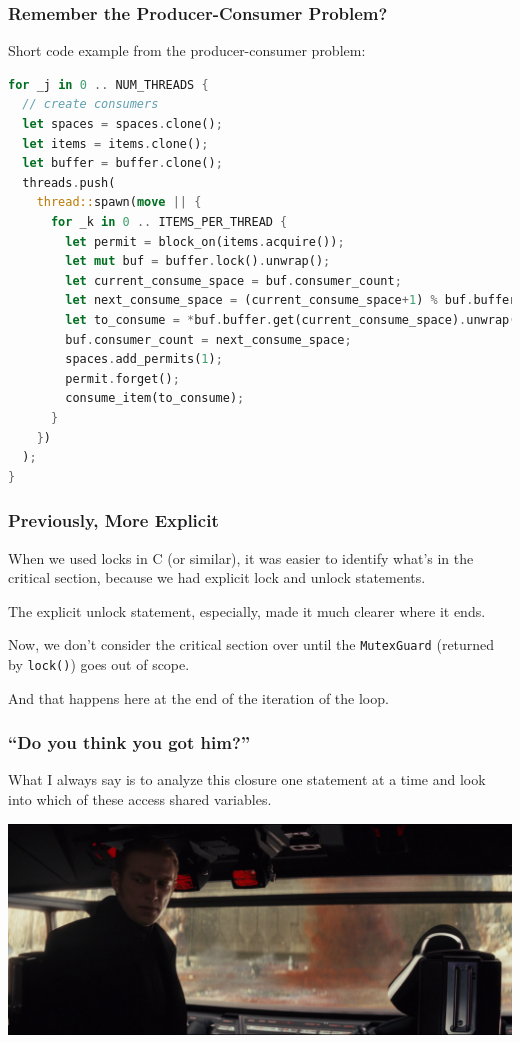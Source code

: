 \begin{frame}[fragile]
\frametitle{Remember the Producer-Consumer Problem?}

Short code example from the producer-consumer problem:
\begin{lstlisting}[language=Rust]
for _j in 0 .. NUM_THREADS {
  // create consumers
  let spaces = spaces.clone();
  let items = items.clone();
  let buffer = buffer.clone();
  threads.push(
    thread::spawn(move || {
      for _k in 0 .. ITEMS_PER_THREAD {
        let permit = block_on(items.acquire());
        let mut buf = buffer.lock().unwrap();
        let current_consume_space = buf.consumer_count;
        let next_consume_space = (current_consume_space+1) % buf.buffer.len();
        let to_consume = *buf.buffer.get(current_consume_space).unwrap();
        buf.consumer_count = next_consume_space;
        spaces.add_permits(1);
        permit.forget();
        consume_item(to_consume);
      }
    })
  );
}

\end{lstlisting}

\end{frame}


\begin{frame}
\frametitle{Previously, More Explicit}

When we used locks in C (or similar), it was easier to identify what's in the critical section, because we had explicit lock and unlock statements. 

The explicit unlock statement, especially, made it much clearer where it ends. 

Now, we don't consider the critical section over until the \texttt{MutexGuard} (returned by \texttt{lock()}) goes out of scope. 

And that happens here at the end of the iteration of the loop.



\end{frame}




\begin{frame}
\frametitle{``Do you think you got him?''}

What I always say is to analyze this closure one statement at a time and look into which of these access shared variables. 

\begin{center}
	\includegraphics[width=\textwidth]{images/gothim.png}
\end{center}

\end{frame}


